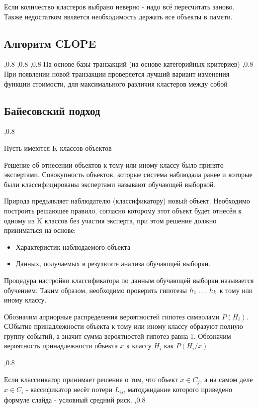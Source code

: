 \documentclass[a4paper,12pt]{report}
\begin{document}
		Если количество кластеров выбрано неверно - надо всё пересчитать заново.
		Также недостатком является необходимость держать все объекты в памяти.

		\subsection{Алгоритм CLOPE }
		,0.8
		,0.8
		,0.8
		На основе базы транзакций (на основе категорийных критериев)
		,0.8
		При появлении новой транзакции проверяется лучший вариант изменения функции стоимости, для максимального различия кластеров между собой

		\subsection{Байесовский подход}
		,0.8

		Пусть имеются K классов объектов

		Решение об отнесении объектов к тому или иному классу было принято экспертами. Совокупность объектов, которые система наблюдала ранее и которые были 	классифицированы экспертами называют обучающей выборкой.

		Природа предъявляет наблюдателю (классификатору) новый объект. Необходимо построить решающее правило, согласно которому этот объект будет отнесён к одному из K 	классов без участия эксперта, при этом решение должно приниматься на основе:
		\begin{itemize}
		\item Характеристик наблюдаемого объекта
		\item Данных, получаемых в результате анализа обучающей выборки.
		\end{itemize}

		Процедура настройки классификатора по данным обучающей выборки называется обучением. Таким образом, необходимо проверить гипотезы $h_1\,\ldots\, h_k$ к тому или иному классу.

		Обозначим априорные распределения вероятностей гипотез символами $P(H_i)$. СОбытие принадлежности объекта к тому или иному классу образуют полную группу событий, а значит сумма вероятностей гипотез равна 1. Обозначим вероятность принадлежности объекта $x$ к классу $H_i$ как $P(H_i/x)$.

		,0.8

		Если классиикатор принимает решение о том, что объект $x \in C_j$, а на самом деле  $x \in C_i$ - кассификатор несёт потери $L_{ij}$, матоджидание которого приведено  формуле слайда - условный средний риск.
		,0.8
\end{document}

